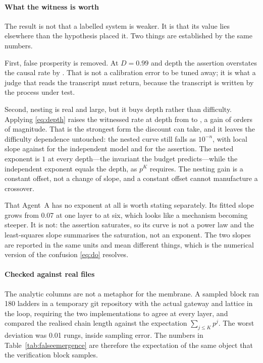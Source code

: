 \documentclass[conference]{IEEEtran}
\theoremstyle{definition}
\begin{document}
\paragraph{What the witness is worth} The result is not that a labelled system is
weaker. It is that its value lies elsewhere than the hypothesis placed it. Two
things are established by the same numbers.

First, false prosperity is removed. At $D=0.99$ and depth \teDepthMax{} the
assertion overstates the causal rate by \teInflationDeep. That is not a calibration
error to be tuned away; it is what a judge that reads the transcript must return,
because the transcript is written by the process under test.

Second, nesting is real and large, but it buys depth rather than difficulty.
Applying \eqref{eq:depth} raises the witnessed rate at depth \teDepthMax{} from
\teBRateNinetyNine{} to \teBNestedRate, a gain of \teBOrders{} orders of magnitude.
That is the strongest form the discount can take, and it leaves the difficulty
dependence untouched: the nested curve still falls as $10^{-n}$, with local slope
\teSlopeBNested{} against \teSlopeB{} for the independent model and \teSlopeA{} for
the assertion. The nested exponent is $1$ at every depth---the invariant the budget
predicts---while the independent exponent equals the depth, as $p^{K}$ requires.
The nesting gain is a constant offset, not a change of slope, and a constant offset
cannot manufacture a crossover.

That Agent~A has no exponent at all is worth stating separately. Its fitted slope
grows from \num{0.07} at one layer to \teSlopeA{} at six, which looks like a
mechanism becoming steeper. It is not: the assertion saturates, so its curve is not
a power law and the least-squares slope summarises the saturation, not an exponent.
The two slopes are reported in the same units and mean different things, which is
the numerical version of the confusion \eqref{eq:do} resolves.

\paragraph{Checked against real files} The analytic columns are not a metaphor for
the membrane. A sampled block ran \num{180} ladders in a temporary git repository
with the actual gateway and lattice in the loop, requiring the two implementations
to agree at every layer, and compared the realised chain length against the
expectation $\sum_{j\le K}p^{j}$. The worst deviation was \num{0.01} rungs, inside
sampling error. The numbers in Table~\ref{tab:falseemergence} are therefore the
expectation of the same object that the verification block samples.
\end{document}
